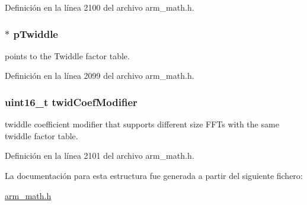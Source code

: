 Definición en la línea 2100 del archivo arm\+\_\+math.\+h.

\subsubsection[{\texorpdfstring{p\+Twiddle}{pTwiddle}}]{$\ast$ p\+Twiddle}\hypertarget{structarm__cfft__radix4__instance__f32_aca581481fccdff0f557f54a3ef20d967}{}\label{structarm__cfft__radix4__instance__f32_aca581481fccdff0f557f54a3ef20d967}
points to the Twiddle factor table. 

Definición en la línea 2099 del archivo arm\+\_\+math.\+h.

\subsubsection[{\texorpdfstring{twid\+Coef\+Modifier}{twidCoefModifier}}]{\setlength{\rightskip}{0pt plus 5cm}uint16\+\_\+t twid\+Coef\+Modifier}\hypertarget{structarm__cfft__radix4__instance__f32_afe772e5b5001c9d8e85032115a8df5bf}{}\label{structarm__cfft__radix4__instance__f32_afe772e5b5001c9d8e85032115a8df5bf}
twiddle coefficient modifier that supports different size F\+F\+Ts with the same twiddle factor table. 

Definición en la línea 2101 del archivo arm\+\_\+math.\+h.



La documentación para esta estructura fue generada a partir del siguiente fichero\+:\begin{DoxyCompactItemize}
\item 
\hyperlink{arm__math_8h}{arm\+\_\+math.\+h}\end{DoxyCompactItemize}

